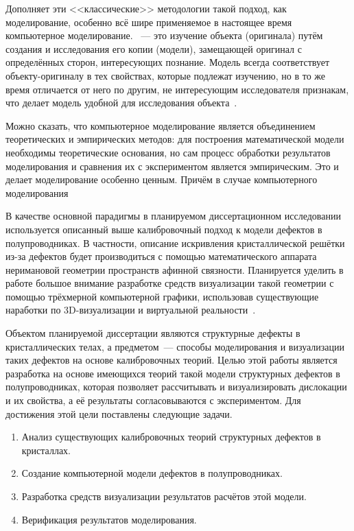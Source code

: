 \documentclass[a4paper, 14pt, titlepage]{extarticle}
\begin{document}
  Дополняет эти <<классические>> методологии такой подход, как моделирование, особенно всё шире
  применяемое в настоящее время компьютерное моделирование.
  ~--- это изучение объекта (оригинала) путём создания и исследования его копии
  (модели), замещающей оригинал с определённых сторон, интересующих познание. Модель всегда
  соответствует объекту-оригиналу в тех свойствах, которые подлежат изучению, но в то же время
  отличается от него по другим, не интересующим исследователя признакам, что делает модель удобной
  для исследования объекта~\cite{frolov-phylos}.

  Можно сказать, что компьютерное моделирование является объединением теоретических и эмпирических
  методов: для построения математической модели необходимы теоретические основания, но сам процесс
  обработки результатов моделирования и сравнения их с экспериментом является эмпирическим. Это и
  делает моделирование особенно ценным. Причём в случае компьютерного моделирования

  В качестве основной парадигмы в планируемом диссертационном исследовании используется описанный
  выше калибровочный подход к модели дефектов в полупроводниках. В частности, описание искривления
  кристаллической решётки из-за дефектов будет производиться с помощью математического аппарата
  неримановой геометрии пространств афинной связности. Планируется уделить в работе большое внимание
  разработке средств визуализации такой геометрии с помощью трёхмерной компьютерной графики,
  использовав существующие наработки по 3D-визуализации и виртуальной реальности~\cite{nia-mnsk-11}.

  Объектом планируемой диссертации являются структурные дефекты в кристаллических телах, а
  предметом~--- способы моделирования и визуализации таких дефектов на основе калибровочных теорий.
  Целью этой работы является разработка на основе имеющихся теорий такой модели структурных дефектов
  в полупроводниках, которая позволяет рассчитывать и визуализировать дислокации и их свойства, а
  её результаты согласовываются с экспериментом. Для достижения этой цели поставлены следующие задачи.
  \begin{enumerate}
    \item Анализ существующих калибровочных теорий структурных дефектов в кристаллах.
    \item Создание компьютерной модели дефектов в полупроводниках.
    \item Разработка средств визуализации результатов расчётов этой модели.
    \item Верификация результатов моделирования.
  \end{enumerate}
\end{document}
